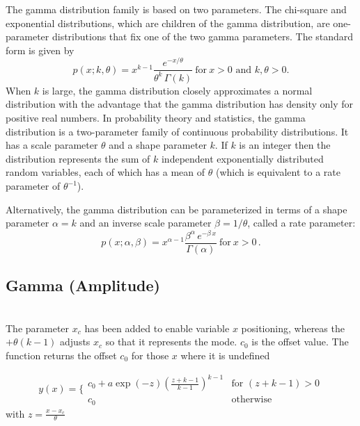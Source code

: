The gamma distribution family is based on two parameters. The
chi-square and exponential distributions, which are children of the
gamma distribution, are one-parameter distributions that fix one of
the two gamma parameters. The standard form is given by
\begin{equation}
\label{eq:GammaDistr}
p(x;k,\theta) = x^{k-1} \frac{e^{-x/\theta}}{\theta^k
\, \Gamma(k)} \ \mathrm{ for }\ x > 0\,\, \mathrm{ and }\,\, k,
\theta > 0.
\end{equation}
When $k$ is large, the gamma distribution closely approximates a
normal distribution with the advantage that the gamma distribution
has density only for positive real numbers.
In probability theory and statistics, the gamma distribution is a
two-parameter family of continuous probability distributions.
It has a scale parameter $\theta$ and a shape parameter $k$. If $k$
is an integer then the distribution represents the sum of $k$ independent
exponentially distributed random variables, each of which has a mean of
$\theta$ (which is equivalent to a rate parameter of $\theta^{-1}$).


Alternatively, the gamma distribution can be parameterized
in terms of a shape parameter $\alpha = k$ and an inverse scale
parameter $\beta = 1/\theta$, called a rate parameter:
\begin{equation}
p(x;\alpha,\beta) = x^{\alpha-1} \frac{\beta^{\alpha} \,
e^{-\beta\,x} }{\Gamma(\alpha)} \ \mathrm{for}\ x > 0 \,\!.
\end{equation}

\vspace{5mm}

\subsection{Gamma (Amplitude)} ~\\
\label{sec:GammaDistrAmplitude}
  The parameter $x_c$ has been added to enable variable $x$ positioning,
  whereas the $+\theta(k-1)$ adjusts $x_c$ so that it represents the mode.
  $c_0$ is the offset value.
  The function returns the offset $c_0$ for those $x$ where it is undefined

  \begin{equation}
   y(x) = \Bigg\{
   \begin{array}{ll}
       c_0 + a \exp(-z) \left(\frac{z+k-1}{k-1}\right)^{k-1} & \mbox{for } (z+k-1) > 0 \\
       c_0 &  \mbox{otherwise}
   \end{array}
  \end{equation}
  with $ z=\frac{x-x_c}{\theta} $

